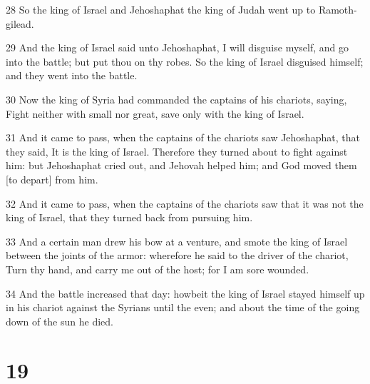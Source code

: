 \par 28 So the king of Israel and Jehoshaphat the king of Judah went up to Ramoth-gilead.
\par 29 And the king of Israel said unto Jehoshaphat, I will disguise myself, and go into the battle; but put thou on thy robes. So the king of Israel disguised himself; and they went into the battle.
\par 30 Now the king of Syria had commanded the captains of his chariots, saying, Fight neither with small nor great, save only with the king of Israel.
\par 31 And it came to pass, when the captains of the chariots saw Jehoshaphat, that they said, It is the king of Israel. Therefore they turned about to fight against him: but Jehoshaphat cried out, and Jehovah helped him; and God moved them [to depart] from him.
\par 32 And it came to pass, when the captains of the chariots saw that it was not the king of Israel, that they turned back from pursuing him.
\par 33 And a certain man drew his bow at a venture, and smote the king of Israel between the joints of the armor: wherefore he said to the driver of the chariot, Turn thy hand, and carry me out of the host; for I am sore wounded.
\par 34 And the battle increased that day: howbeit the king of Israel stayed himself up in his chariot against the Syrians until the even; and about the time of the going down of the sun he died.

\chapter{19}

